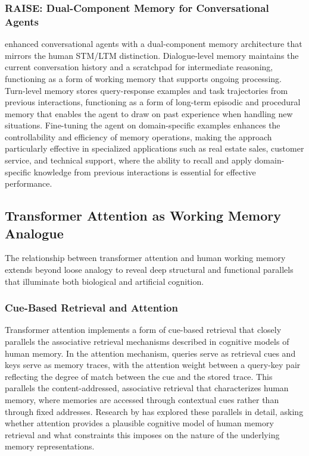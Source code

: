 \documentclass[11pt,letterpaper]{article}
\begin{document}
\subsubsection{RAISE: Dual-Component Memory for Conversational Agents}

\cite{liu2024raise} enhanced conversational agents with a dual-component memory architecture that mirrors the human STM/LTM distinction. Dialogue-level memory maintains the current conversation history and a scratchpad for intermediate reasoning, functioning as a form of working memory that supports ongoing processing. Turn-level memory stores query-response examples and task trajectories from previous interactions, functioning as a form of long-term episodic and procedural memory that enables the agent to draw on past experience when handling new situations. Fine-tuning the agent on domain-specific examples enhances the controllability and efficiency of memory operations, making the approach particularly effective in specialized applications such as real estate sales, customer service, and technical support, where the ability to recall and apply domain-specific knowledge from previous interactions is essential for effective performance.

\subsection{Transformer Attention as Working Memory Analogue}

The relationship between transformer attention and human working memory extends beyond loose analogy to reveal deep structural and functional parallels that illuminate both biological and artificial cognition.

\subsubsection{Cue-Based Retrieval and Attention}

Transformer attention implements a form of cue-based retrieval that closely parallels the associative retrieval mechanisms described in cognitive models of human memory. In the attention mechanism, queries serve as retrieval cues and keys serve as memory traces, with the attention weight between a query-key pair reflecting the degree of match between the cue and the stored trace. This parallels the content-addressed, associative retrieval that characterizes human memory, where memories are accessed through contextual cues rather than through fixed addresses. Research by \cite{ryskin2025attention} has explored these parallels in detail, asking whether attention provides a plausible cognitive model of human memory retrieval and what constraints this imposes on the nature of the underlying memory representations.
\end{document}
